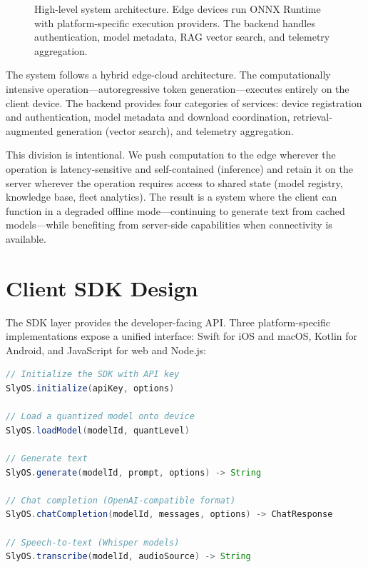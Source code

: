 \documentclass[12pt, letterpaper, twoside]{report}
\begin{document}
\begin{figure}[H]
\caption{High-level system architecture. Edge devices run ONNX Runtime with platform-specific execution providers. The backend handles authentication, model metadata, RAG vector search, and telemetry aggregation.}
\label{fig:architecture}
\end{figure}

The system follows a hybrid edge-cloud architecture. The computationally intensive operation---autoregressive token generation---executes entirely on the client device. The backend provides four categories of services: device registration and authentication, model metadata and download coordination, retrieval-augmented generation (vector search), and telemetry aggregation.

This division is intentional. We push computation to the edge wherever the operation is latency-sensitive and self-contained (inference) and retain it on the server wherever the operation requires access to shared state (model registry, knowledge base, fleet analytics). The result is a system where the client can function in a degraded offline mode---continuing to generate text from cached models---while benefiting from server-side capabilities when connectivity is available.

\section{Client SDK Design}
\label{sec:sdk_design}

The SDK layer provides the developer-facing API. Three platform-specific implementations expose a unified interface: Swift for iOS and macOS, Kotlin for Android, and JavaScript for web and Node.js:

\begin{lstlisting}[language=Java, caption={Unified SDK API surface}]
// Initialize the SDK with API key
SlyOS.initialize(apiKey, options)

// Load a quantized model onto device
SlyOS.loadModel(modelId, quantLevel)

// Generate text
SlyOS.generate(modelId, prompt, options) -> String

// Chat completion (OpenAI-compatible format)
SlyOS.chatCompletion(modelId, messages, options) -> ChatResponse

// Speech-to-text (Whisper models)
SlyOS.transcribe(modelId, audioSource) -> String
\end{lstlisting}
\end{document}

